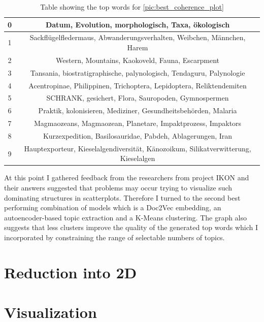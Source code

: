\begin{table}
	\centering
	\begin{tabular}{c | c}
		0 & Datum, Evolution, morphologisch, Taxa, ökologisch \\ \hline
		1 & Sackflügelfledermaus, Abwanderungsverhalten, Weibchen, Männchen, Harem \\ \hline
		2 & Western, Mountains, Kaokoveld, Fauna, Escarpment \\ \hline
		3 & Tansania, biostratigraphische, palynologisch, Tendaguru, Palynologie \\ \hline
		4 & Acentropinae, Philippinen, Trichoptera, Lepidoptera, Reliktendemiten \\ \hline
		5 & SCHRANK, gesichert, Flora, Sauropoden, Gymnospermen \\ \hline
		6 & Praktik, kolonisieren, Mediziner, Gesundheitsbehörden, Malaria \\ \hline
		7 & Magmaozeans, Magmaozean, Planetare, Impaktprozess, Impaktors \\ \hline
		8 & Kurzexpedition, Basilosauridae, Pabdeh, Ablagerungen, Iran \\ \hline
		9 & Hauptexporteur, Kieselalgendiversität, Känozoikum, Silikatverwitterung, Kieselalgen \\ \hline
	\end{tabular}
	\caption{\label{tab:best_coherence_table} Table showing the top words for {\autoref{pic:best_coherence_plot}}}
\end{table}

At this point I gathered feedback from the researchers from project IKON and their answers suggested that problems may occur trying to visualize such dominating structures in scatterplots. 
Therefore I turned to the second best performing combination of models which is a Doc2Vec embedding, an autoencoder-based topic extraction and a K-Means clustering. The graph also suggests that less clusters improve the quality of the generated top words which I incorporated by constraining the range of selectable numbers of topics.

\section{Reduction into 2D}

\section{Visualization}

